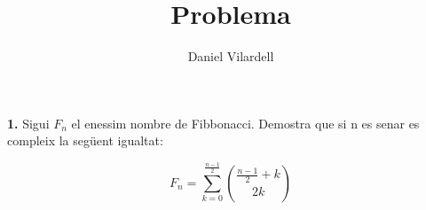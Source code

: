 \documentclass[12pt, a4papre]{article}
\author{Daniel Vilardell}
\title{Problema}
\date{}
\begin{document}
	\maketitle
	\textbf{1.} Sigui $F_n$ el enessim nombre de Fibbonacci. Demostra que si n es senar es compleix la següent igualtat:
	
	\[
		F_n = \sum_{k=0}^{\frac{n-1}{2}} {\frac{n-1}{2}+k \choose 2k }
	\]
\end{document}
